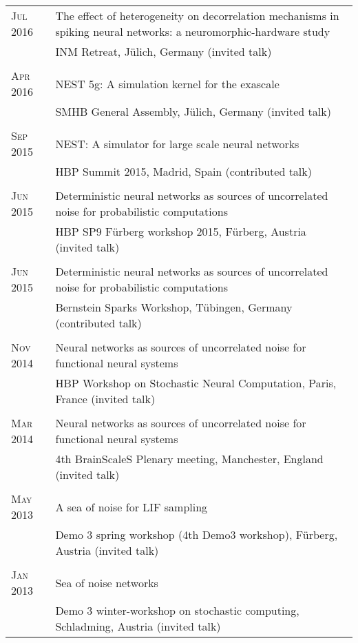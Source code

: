 \begin{longtable}{>{\hfill}p{3.3cm}|p{12.0cm}}
  \textsc{Jul} 2016 & The effect of heterogeneity on decorrelation mechanisms in spiking neural networks: a neuromorphic-hardware study \\
  & \footnotesize INM Retreat, J\"ulich, Germany (invited talk)\\
  \multicolumn{2}{c}{} \\
  \textsc{Apr} 2016 & NEST 5g: A simulation kernel for the exascale \\
  & \footnotesize SMHB General Assembly, J\"ulich, Germany (invited talk)\\
  \multicolumn{2}{c}{} \\
  \textsc{Sep} 2015 & NEST: A simulator for large scale neural networks\\
  & \footnotesize HBP Summit 2015, Madrid, Spain (contributed talk)\\
  \multicolumn{2}{c}{} \\
  \textsc{Jun} 2015 & Deterministic neural networks as sources of uncorrelated noise for probabilistic computations\\
  & \footnotesize HBP SP9 F\"urberg workshop 2015, F\"urberg, Austria (invited talk) \\
  \multicolumn{2}{c}{} \\
  \textsc{Jun} 2015 & Deterministic neural networks as sources of uncorrelated noise for probabilistic computations \\
  & \footnotesize Bernstein Sparks Workshop, T\"ubingen, Germany (contributed talk)\\
  \multicolumn{2}{c}{} \\
  \textsc{Nov} 2014 & Neural networks as sources of uncorrelated noise for functional neural systems \\
  & \footnotesize HBP Workshop on Stochastic Neural Computation, Paris, France (invited talk)\\
  \multicolumn{2}{c}{} \\
  \textsc{Mar} 2014 & Neural networks as sources of uncorrelated noise for functional neural systems \\
  & \footnotesize 4th BrainScaleS Plenary meeting, Manchester, England  (invited talk)\\
  \multicolumn{2}{c}{} \\
  \textsc{May} 2013 & A sea of noise for LIF sampling \\
  & \footnotesize Demo 3 spring workshop (4th Demo3 workshop), F\"urberg, Austria  (invited talk)\\
  \multicolumn{2}{c}{} \\
  \textsc{Jan} 2013 & Sea of noise networks \\
  & \footnotesize Demo 3 winter-workshop on stochastic computing, Schladming, Austria (invited talk)\\
\end{longtable}
